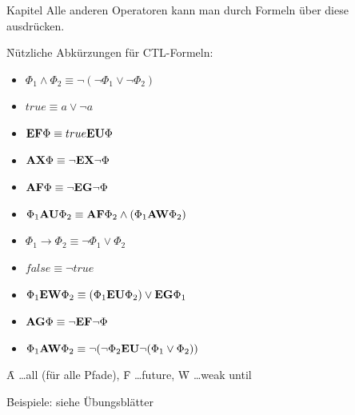 \begin{chapter}{Kapitel}
\noindent Alle anderen Operatoren kann man durch Formeln über diese ausdrücken. 
\vspace*{5pt}

\f{Nützliche Abkürzungen für CTL-Formeln}:
\begin{itemize}
 \item $\Phi_1\wedge\Phi_2 \equiv \neg(\neg\Phi_1\vee\neg\Phi_2)$
 \item $true \equiv a\vee\neg a$
 \item $\f{EF}\Phi \equiv true\f{EU}\Phi$
 \item $\f{AX}\Phi \equiv \neg\f{EX}\neg\Phi$
 \item $\f{AF}\Phi \equiv \neg\f{EG}\neg\Phi$
 \item $\Phi_1\f{AU}\Phi_2 \equiv \f{AF}\Phi_2 \wedge (\Phi_1\f{AW}\Phi_2)$
 \item $\Phi_1 \rightarrow \Phi_2 \equiv \neg\Phi_1\vee\Phi_2$
 \item $false \equiv \neg true$
 \item $\Phi_1\f{EW}\Phi_2 \equiv (\Phi_1\f{EU}\Phi_2)\vee\f{EG}\Phi_1$
 \item $\f{AG}\Phi \equiv \neg\f{EF}\neg\Phi$
 \item $\Phi_1\f{AW}\Phi_2 \equiv \neg(\neg\Phi_2\f{EU}\neg(\Phi_1\vee\Phi_2))$
\end{itemize}
\f{A} \dots all (für alle Pfade), \f{F} \dots future, \f{W} \dots weak until
\vspace*{5pt}

\f{Beispiele: siehe Übungsblätter}

\end{chapter}
